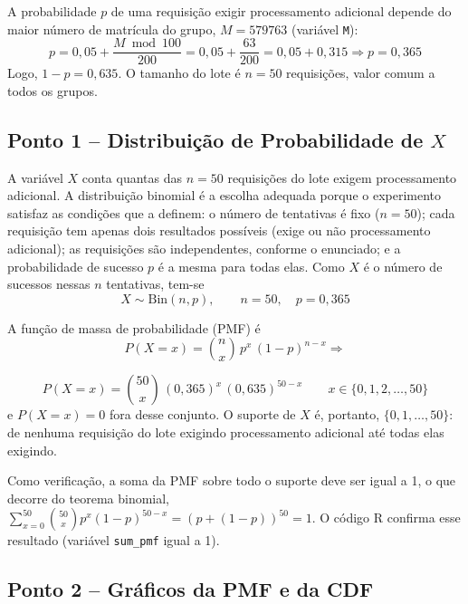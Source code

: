 \documentclass[10pt,a4paper]{article}
\begin{document}
A probabilidade $p$ de uma requisição exigir processamento adicional depende do maior número de matrícula do grupo, $M = 579763$ (variável \texttt{M}):
\[
p = 0{,}05 + \frac{M \bmod 100}{200} = 0{,}05 + \frac{63}{200} = 0{,}05 + 0{,}315 \Rightarrow \boxed{p = 0{,}365}
\]
Logo, $1 - p = 0{,}635$. O tamanho do lote é $n = 50$ requisições, valor comum a todos os grupos.

\subsection{Ponto 1 -- Distribuição de Probabilidade de $X$}

A variável $X$ conta quantas das $n = 50$ requisições do lote exigem processamento adicional. A distribuição binomial é a escolha adequada porque o experimento satisfaz as condições que a definem: o número de tentativas é fixo ($n = 50$); cada requisição tem apenas dois resultados possíveis (exige ou não processamento adicional); as requisições são independentes, conforme o enunciado; e a probabilidade de sucesso $p$ é a mesma para todas elas. Como $X$ é o número de sucessos nessas $n$ tentativas, tem-se
\[
X \sim \text{Bin}(n, p), \qquad \boxed{n = 50, \quad p = 0{,}365}
\]

A função de massa de probabilidade (PMF) é
\[
P(X = x) = \binom{n}{x}\, p^{x}\, (1-p)^{n-x} \Rightarrow 
\]

\[
\boxed{P(X = x) = \binom{50}{x}\, (0{,}365)^{x}\, (0{,}635)^{50-x}} \qquad x \in \{0, 1, 2, \dots, 50\}
\]
e $P(X = x) = 0$ fora desse conjunto. O suporte de $X$ é, portanto, $\{0, 1, \dots, 50\}$: de nenhuma requisição do lote exigindo processamento adicional até todas elas exigindo.

Como verificação, a soma da PMF sobre todo o suporte deve ser igual a 1, o que decorre do teorema binomial, $\sum_{x=0}^{50} \binom{50}{x} p^x (1-p)^{50-x} = (p + (1-p))^{50} = 1$. O código R confirma esse resultado (variável \texttt{sum\_pmf} igual a 1).

\subsection{Ponto 2 -- Gráficos da PMF e da CDF}
\end{document}
